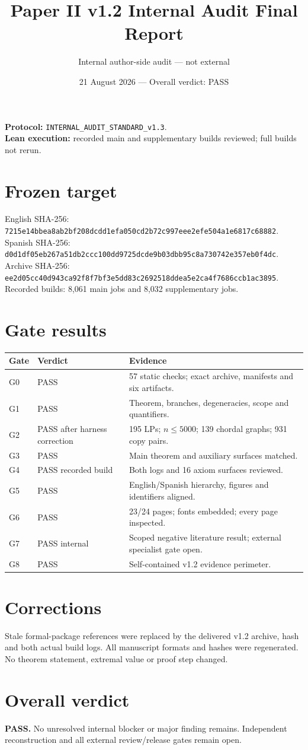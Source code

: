 \documentclass[11pt]{article}
\title{Paper II v1.2 Internal Audit Final Report}
\author{Internal author-side audit --- not external}
\date{21 August 2026 --- Overall verdict: PASS}
\begin{document}
\maketitle
\textbf{Protocol:} \texttt{INTERNAL\_AUDIT\_STANDARD\_v1.3}.\\
\textbf{Lean execution:} recorded main and supplementary builds reviewed; full builds not rerun.
\section{Frozen target}
English SHA-256: \texttt{7215e14bbea8ab2bf208dcdd1efa050cd2b72c997eee2efe504a1e6817c68882}.\\
Spanish SHA-256: \texttt{d0d1df05eb267a51db2ccc100dd9725dcde9b03dbb95c8a730742e357eb0f4dc}.\\
Archive SHA-256: \texttt{ee2d05cc40d943ca92f8f7bf3e5dd83c2692518ddea5e2ca4f7686ccb1ac3895}.\\
Recorded builds: 8,061 main jobs and 8,032 supplementary jobs.
\section{Gate results}
\begin{longtable}{p{.18\linewidth}p{.20\linewidth}p{.52\linewidth}}
\toprule Gate & Verdict & Evidence \\ \midrule
G0 & PASS & 57 static checks; exact archive, manifests and six artifacts. \\
G1 & PASS & Theorem, branches, degeneracies, scope and quantifiers. \\
G2 & PASS after harness correction & 195 LPs; $n\le5000$; 139 chordal graphs; 931 copy pairs. \\
G3 & PASS & Main theorem and auxiliary surfaces matched. \\
G4 & PASS recorded build & Both logs and 16 axiom surfaces reviewed. \\
G5 & PASS & English/Spanish hierarchy, figures and identifiers aligned. \\
G6 & PASS & 23/24 pages; fonts embedded; every page inspected. \\
G7 & PASS internal & Scoped negative literature result; external specialist gate open. \\
G8 & PASS & Self-contained v1.2 evidence perimeter. \\
\bottomrule\end{longtable}
\section{Corrections}
Stale formal-package references were replaced by the delivered v1.2 archive,
hash and both actual build logs. All manuscript formats and hashes were
regenerated. No theorem statement, extremal value or proof step changed.
\section{Overall verdict}
\textbf{PASS.} No unresolved internal blocker or major finding remains.
Independent reconstruction and all external review/release gates remain open.
\end{document}
